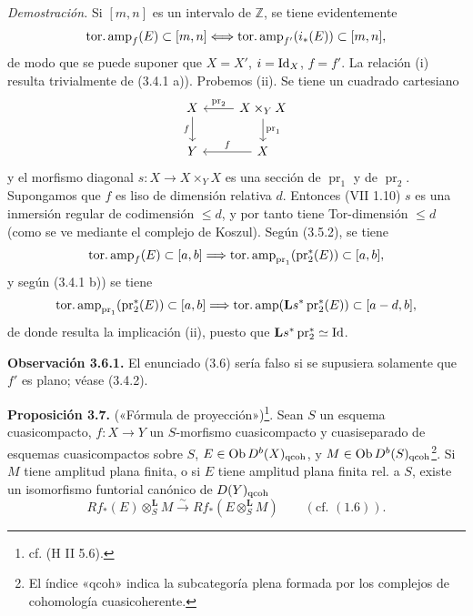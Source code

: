 \emph{Demostración.} Si \([m,n]\) es un intervalo de \(\mathbb Z\), se tiene evidentemente
\[
 \operatorname{tor.amp}_f(E)\subset[m,n]
 \Longleftrightarrow
 \operatorname{tor.amp}_{f'}(i_*(E))\subset[m,n],
\]
de modo que se puede suponer que \(X=X'\), \(i=\operatorname{Id}_X\), \(f=f'\). La relación (i) resulta trivialmente de (3.4.1 a)). Probemos (ii). Se tiene un cuadrado cartesiano
\[
\begin{tikzcd}
X \arrow[d,"f"'] & X\times_Y X \arrow[l,"\operatorname{pr}_2"'] \arrow[d,"\operatorname{pr}_1"]\\
Y & X \arrow[l,"f"']
\end{tikzcd}
\]
y el morfismo diagonal \(s:X\longrightarrow X\times_YX\) es una sección de \(\operatorname{pr}_1\) y de \(\operatorname{pr}_2\). Supongamos que \(f\) es liso de dimensión relativa \(d\). Entonces (VII 1.10) \(s\) es una inmersión regular de codimensión \(\leq d\), y por tanto tiene Tor-dimensión \(\leq d\) (como se ve mediante el complejo de Koszul). Según (3.5.2), se tiene
\[
 \operatorname{tor.amp}_f(E)\subset[a,b]
 \Longrightarrow
 \operatorname{tor.amp}_{\operatorname{pr}_1}(\operatorname{pr}_2^*(E))\subset[a,b],
\]
y según (3.4.1 b)) se tiene
\[
 \operatorname{tor.amp}_{\operatorname{pr}_1}(\operatorname{pr}_2^*(E))\subset[a,b]
 \Longrightarrow
 \operatorname{tor.amp}(\mathbf Ls^*\operatorname{pr}_2^*(E))\subset[a-d,b],
\]
de donde resulta la implicación (ii), puesto que \(\mathbf Ls^*\operatorname{pr}_2^*\simeq\operatorname{Id}\).

\textbf{Observación 3.6.1.} El enunciado (3.6) sería falso si se supusiera solamente que \(f'\) es plano; véase (3.4.2).

\textbf{Proposición 3.7.} («Fórmula de proyección»)\footnote{cf. (H II 5.6).}. Sean \(S\) un esquema cuasicompacto, \(f:X\to Y\) un \(S\)-morfismo cuasicompacto y cuasiseparado de esquemas cuasicompactos sobre \(S\), \(E\in\operatorname{Ob} D^b(X)_{\mathrm{qcoh}}\), y \(M\in\operatorname{Ob} D^b(S)_{\mathrm{qcoh}}\)\footnote{El índice «qcoh» indica la subcategoría plena formada por los complejos de cohomología cuasicoherente.}. Si \(M\) tiene amplitud plana finita, o si \(E\) tiene amplitud plana finita rel. a \(S\), existe un isomorfismo funtorial canónico de \(D(Y)_{\mathrm{qcoh}}\)
\[
 Rf_*(E)\otimes_S^{\mathbf L}M
 \xrightarrow{\sim}
 Rf_*(E\otimes_S^{\mathbf L}M)\qquad(\text{cf. }(1.6)).
\]

